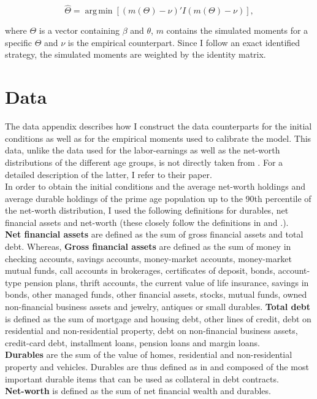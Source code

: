 \documentclass[a4paper,12pt,legno]{article}
\begin{document}
\[ \widehat{\Theta} = \operatorname{arg\,min}[(m(\Theta )-\nu)'I(m(\Theta )-\nu)], \]

where $\Theta$ is a vector containing $\beta$ and $\theta$, $m$ contains the simulated moments for a specific $\Theta$ and $\nu$ is the empirical counterpart. 
Since I follow an exact identified strategy, the simulated moments are weighted by the identity matrix. 

\section{Data}
\label{data}
The data appendix describes how I construct the data counterparts for the initial conditions as well as for the empirical moments used to calibrate the model. This data, unlike the data used for the labor-earnings as well as the net-worth distributions of the different age groups, is not directly taken from \cite{hintermaier2011}. For a detailed description of the latter, I refer to their paper. \\
In order to obtain the initial conditions and the average net-worth holdings and average durable holdings of the prime age population up to the 90th percentile of the net-worth distribution, I used the following definitions for durables, net financial assets and net-worth (these closely follow the definitions in \cite{hintermaier2010} and \cite{hintermaier2011}.). \\
\textbf{Net financial assets} are defined as the sum of gross financial assets and total debt. Whereas, \textbf{Gross financial assets} are defined as the sum of money in checking accounts, savings accounts, money-market accounts, money-market mutual funds, call accounts in brokerages, certificates of deposit, bonds, account-type pension plans, thrift accounts, the current value of life insurance, savings in bonds, other managed funds, other financial assets, stocks, mutual funds, owned non-financial business assets and jewelry, antiques or small durables.
\textbf{Total debt} is defined as the sum of mortgage and housing debt, other lines of credit, debt on residential and non-residential property, debt on non-financial business assets, credit-card debt, installment loans, pension loans and margin loans.\\
\textbf{Durables} are the sum of the value of homes, residential and non-residential property and vehicles. Durables are thus defined as in \cite{hintermaier2010} and composed of the most important durable items that can be used as collateral in debt contracts. \\  \textbf{Net-worth} is defined as the sum of net financial wealth and durables.  \\
\end{document}
